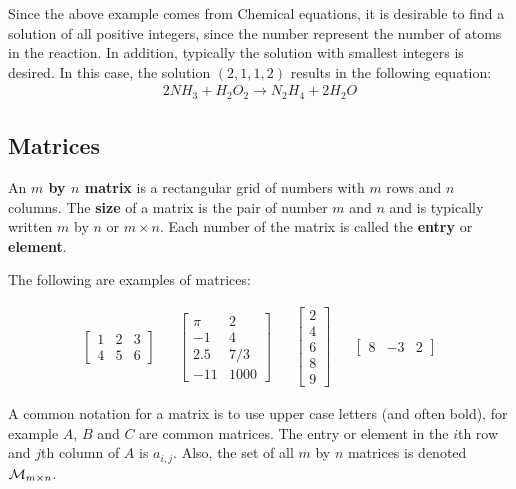 Since the above example comes from Chemical equations, it is desirable to find a solution of all positive integers, since the number represent the number of atoms in the reaction.  In addition, typically the solution with smallest integers is desired.  In this case, the solution $(2,1,1,2)$ results in the following equation:
\begin{align*}
2 NH_3 + H_2O_2 \rightarrow N_2 H_4 + 2 H_2 O
\end{align*}


\subsection{Matrices} \label{sect:matrices}

\begin{definition}
An \textbf{$m$ by $n$ matrix} is a rectangular grid of numbers with $m$ rows and $n$ columns. The \textbf{size} of a matrix is the pair of number $m$ and $n$ and is typically written $m$ by $n$ or $m \times n$.  Each number of the matrix is called the \textbf{entry} or \textbf{element}.
\end{definition}

\begin{example} \label{ex:matrices}
The following are examples of matrices:

\begin{align*}
\begin{bmatrix}
1 & 2 &3 \\
4 & 5 & 6
\end{bmatrix} &&
\begin{bmatrix}
\pi & 2 \\
-1 & 4 \\
2.5 & 7/3 \\
-11 & 1000
\end{bmatrix} &&
\begin{bmatrix}
2 \\ 4 \\ 6 \\ 8 \\ 9
\end{bmatrix} &&
\begin{bmatrix}
8 & -3 & 2
\end{bmatrix}
\end{align*}

\end{example}

A common notation for a matrix is to use upper case letters (and often bold), for example $A$, $B$ and $C$ are common matrices.  The entry or element in the $i$th row and $j$th column of $A$ is $a_{i,j}$.    Also, the set of all $m$ by $n$ matrices is denoted ${\cal M}_{m \times n}$.


